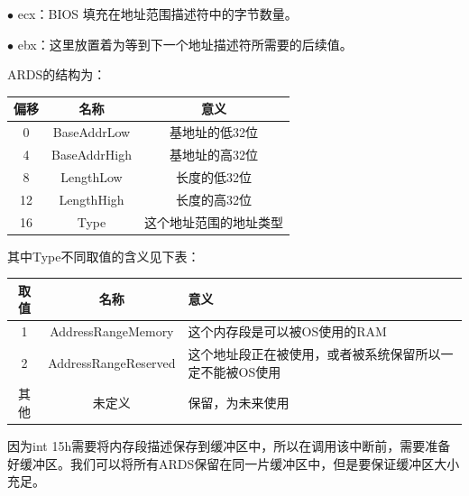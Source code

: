\documentclass[UTF8,12pt]{ctexart}
\begin{document}
    $\bullet$ ecx：BIOS 填充在地址范围描述符中的字节数量。
    
    $\bullet$ ebx：这里放置着为等到下一个地址描述符所需要的后续值。
    
    ARDS的结构为：
    \begin{table}[H]
    \centering
    \begin{tabular}{|c|c|c|}
    \hline
    {\color[HTML]{333333} \textbf{偏移}} & {\color[HTML]{333333} \textbf{名称}} & \textbf{意义} \\ \hline
    0   & BaseAddrLow     & 基地址的低32位    \\ \hline
    4   & BaseAddrHigh     & 基地址的高32位    \\ \hline
    8   & LengthLow     & 长度的低32位     \\ \hline
    12   & LengthHigh   & 长度的高32位     \\ \hline
    16         & Type   & 这个地址范围的地址类型 \\ \hline
    \end{tabular}
    \end{table}
    
    其中Type不同取值的含义见下表：
\begin{table}[H]
\centering
\begin{tabular}{|c|c|p{8cm}<{\centering}|}
\hline
{\color[HTML]{333333} \textbf{取值}} & {\color[HTML]{333333} \textbf{名称}} & \textbf{意义}                   \\ \hline
1    & AddressRangeMemory    & 这个内存段是可以被OS使用的RAM             \\ \hline
2   & AddressRangeReserved & 这个地址段正在被使用，或者被系统保留所以一定不能被OS使用 \\ \hline
其他                                 & 未定义                                & 保留，为未来使用                      \\ \hline
\end{tabular}
\end{table}
    因为int 15h需要将内存段描述保存到缓冲区中，所以在调用该中断前，需要准备好缓冲区。我们可以将所有ARDS保留在同一片缓冲区中，但是要保证缓冲区大小充足。
    
\end{document}
